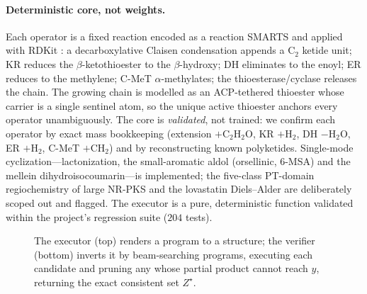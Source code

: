 \documentclass[11pt]{article}
\theoremstyle{definition}
\newcommand{\zstar}{\ensuremath{Z^{\star}}}
\begin{document}
\paragraph{Deterministic core, not weights.} Each operator is a fixed reaction encoded as a
reaction SMARTS and applied with RDKit \citep{rdkit}: a decarboxylative Claisen condensation
appends a $\mathrm{C}_2$ ketide unit; KR reduces the $\beta$-ketothioester to the
$\beta$-hydroxy; DH eliminates to the enoyl; ER reduces to the methylene; C-MeT
$\alpha$-methylates; the thioesterase/cyclase releases the chain. The growing chain is modelled
as an ACP-tethered thioester whose carrier is a single sentinel atom, so the unique active
thioester anchors every operator unambiguously. The core is \emph{validated}, not trained: we
confirm each operator by exact mass bookkeeping (extension $+\mathrm{C_2H_2O}$, KR $+\mathrm{H_2}$,
DH $-\mathrm{H_2O}$, ER $+\mathrm{H_2}$, C-MeT $+\mathrm{CH_2}$) and by reconstructing known
polyketides. Single-mode cyclization---lactonization, the small-aromatic aldol (orsellinic,
6-MSA) and the mellein dihydroisocoumarin---is implemented; the five-class PT-domain
regiochemistry of large NR-PKS and the lovastatin Diels--Alder are deliberately scoped out and
flagged. The executor is a pure, deterministic function validated within the project's regression
suite ($204$ tests).

\begin{figure}[t]
\centering
{}
\caption{The executor (top) renders a program to a structure; the verifier (bottom)
inverts it by beam-searching programs, executing each candidate and pruning any whose partial
product cannot reach $y$, returning the exact consistent set \zstar{}.}
\label{fig:pipeline}
\end{figure}
\end{document}

